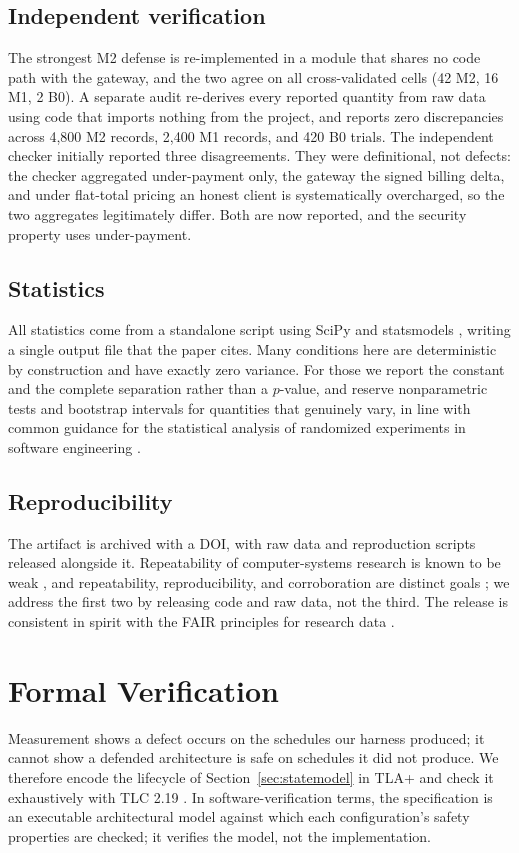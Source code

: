 \documentclass[manuscript,review]{acmart}
\begin{document}
\subsection{Independent verification}
The strongest M2 defense is re-implemented in a module that shares no code path with the
gateway, and the two agree on all cross-validated cells (42 M2, 16 M1, 2 B0). A separate
audit re-derives every reported quantity from raw data using code that imports nothing
from the project, and reports zero discrepancies across 4{,}800 M2 records, 2{,}400 M1
records, and 420 B0 trials. The independent checker initially reported three
disagreements. They were definitional, not defects: the checker aggregated under-payment
only, the gateway the signed billing delta, and under flat-total pricing an honest client
is systematically overcharged, so the two aggregates legitimately differ. Both are now
reported, and the security property uses under-payment.

\subsection{Statistics}
All statistics come from a standalone script using SciPy \citep{scipy} and statsmodels
\citep{statsmodels}, writing a
single output file that the paper cites. Many conditions here are deterministic by
construction and have exactly zero variance. For those we report the constant and the
complete separation rather than a $p$-value, and reserve nonparametric tests and
bootstrap intervals \citep{efron} for quantities that genuinely vary, in line with common
guidance for the statistical analysis of randomized experiments in software engineering
\citep{arcuri}.

\subsection{Reproducibility}
The artifact is archived with a DOI, with raw data and reproduction scripts released
alongside it. Repeatability of computer-systems research is known to be weak
\citep{collberg}, and repeatability, reproducibility, and corroboration are distinct
goals \citep{feitelson}; we address the first two by releasing code and raw data, not the
third. The release is consistent in spirit with the FAIR principles for research data
\citep{fair}.

\section{Formal Verification}
\label{sec:formal}
Measurement shows a defect occurs on the schedules our harness produced; it cannot show a
defended architecture is safe on schedules it did not produce. We therefore encode the
lifecycle of Section~\ref{sec:statemodel} in TLA+ \citep{tla} and check it exhaustively
with TLC 2.19 \citep{tlc}. In software-verification terms, the specification is an
executable architectural model against which each configuration's safety properties are
checked; it verifies the model, not the implementation.
\end{document}
